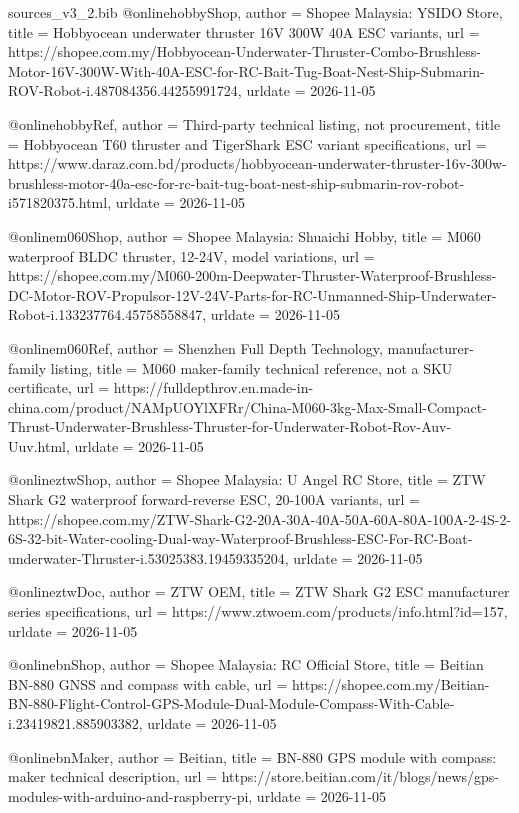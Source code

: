 \begin{filecontents*}[overwrite]{sources_v3_2.bib}
@online{hobbyShop,
  author = {Shopee Malaysia: YSIDO Store},
  title = {Hobbyocean underwater thruster 16V 300W 40A ESC variants},
  url = {https://shopee.com.my/Hobbyocean-Underwater-Thruster-Combo-Brushless-Motor-16V-300W-With-40A-ESC-for-RC-Bait-Tug-Boat-Nest-Ship-Submarin-ROV-Robot-i.487084356.44255991724},
  urldate = {2026-11-05}
}

@online{hobbyRef,
  author = {Third-party technical listing, not procurement},
  title = {Hobbyocean T60 thruster and TigerShark ESC variant specifications},
  url = {https://www.daraz.com.bd/products/hobbyocean-underwater-thruster-16v-300w-brushless-motor-40a-esc-for-rc-bait-tug-boat-nest-ship-submarin-rov-robot-i571820375.html},
  urldate = {2026-11-05}
}

@online{m060Shop,
  author = {Shopee Malaysia: Shuaichi Hobby},
  title = {M060 waterproof BLDC thruster, 12-24V, model variations},
  url = {https://shopee.com.my/M060-200m-Deepwater-Thruster-Waterproof-Brushless-DC-Motor-ROV-Propulsor-12V-24V-Parts-for-RC-Unmanned-Ship-Underwater-Robot-i.133237764.45758558847},
  urldate = {2026-11-05}
}

@online{m060Ref,
  author = {Shenzhen Full Depth Technology, manufacturer-family listing},
  title = {M060 maker-family technical reference, not a SKU certificate},
  url = {https://fulldepthrov.en.made-in-china.com/product/NAMpUOYlXFRr/China-M060-3kg-Max-Small-Compact-Thrust-Underwater-Brushless-Thruster-for-Underwater-Robot-Rov-Auv-Uuv.html},
  urldate = {2026-11-05}
}

@online{ztwShop,
  author = {Shopee Malaysia: U Angel RC Store},
  title = {ZTW Shark G2 waterproof forward-reverse ESC, 20-100A variants},
  url = {https://shopee.com.my/ZTW-Shark-G2-20A-30A-40A-50A-60A-80A-100A-2-4S-2-6S-32-bit-Water-cooling-Dual-way-Waterproof-Brushless-ESC-For-RC-Boat-underwater-Thruster-i.53025383.19459335204},
  urldate = {2026-11-05}
}

@online{ztwDoc,
  author = {ZTW OEM},
  title = {ZTW Shark G2 ESC manufacturer series specifications},
  url = {https://www.ztwoem.com/products/info.html?id=157},
  urldate = {2026-11-05}
}

@online{bnShop,
  author = {Shopee Malaysia: RC Official Store},
  title = {Beitian BN-880 GNSS and compass with cable},
  url = {https://shopee.com.my/Beitian-BN-880-Flight-Control-GPS-Module-Dual-Module-Compass-With-Cable-i.23419821.885903382},
  urldate = {2026-11-05}
}

@online{bnMaker,
  author = {Beitian},
  title = {BN-880 GPS module with compass: maker technical description},
  url = {https://store.beitian.com/it/blogs/news/gps-modules-with-arduino-and-raspberry-pi},
  urldate = {2026-11-05}
}


\end{filecontents*}

